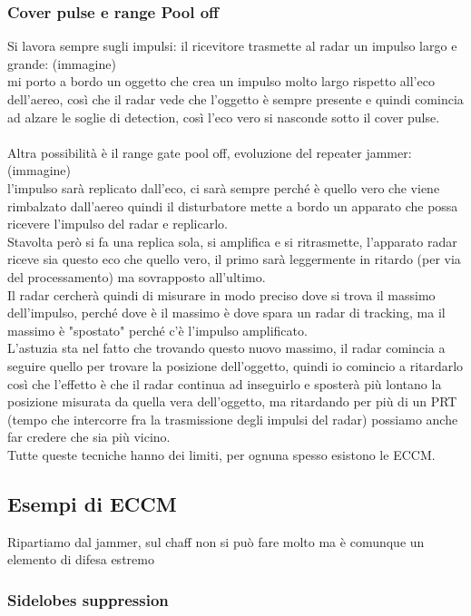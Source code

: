 \documentclass[oneside, 12pt]{extbook}
\begin{document}
\subsubsection{Cover pulse e range Pool off}
Si lavora sempre sugli impulsi: il ricevitore trasmette al radar un impulso largo e grande: (immagine)\\
mi porto a bordo un oggetto che crea un impulso molto largo rispetto all'eco dell'aereo, così che il radar vede che l'oggetto è sempre presente e quindi comincia ad alzare le soglie di detection, così l'eco vero si nasconde sotto il cover pulse.\\\\
Altra possibilità è il range gate pool off, evoluzione del repeater jammer: (immagine)\\
l'impulso sarà replicato dall'eco, ci sarà sempre perché è quello vero che viene rimbalzato dall'aereo quindi il disturbatore mette a bordo un apparato che possa ricevere l'impulso del radar e replicarlo.\\
Stavolta però si fa una replica sola, si amplifica e si ritrasmette, l'apparato radar riceve sia questo eco che quello vero, il primo sarà leggermente in ritardo (per via del processamento) ma sovrapposto all'ultimo.\\
Il radar cercherà quindi di misurare in modo preciso dove si trova il massimo dell'impulso, perché dove è il massimo è dove spara un radar di tracking, ma il massimo è "spostato" perché c'è l'impulso amplificato.\\
L'astuzia sta nel fatto che trovando questo nuovo massimo, il radar comincia a seguire quello per trovare la posizione dell'oggetto, quindi io comincio a ritardarlo così che l'effetto è che il radar continua ad inseguirlo e sposterà più lontano la posizione misurata da quella vera dell'oggetto, ma ritardando per più di un PRT (tempo che intercorre fra la trasmissione degli impulsi del radar) possiamo anche far credere che sia più vicino.\\
Tutte queste tecniche hanno dei limiti, per ognuna spesso esistono le ECCM.

\subsection{Esempi di ECCM}
Ripartiamo dal jammer, sul chaff non si può fare molto ma è comunque un elemento di difesa estremo

\subsubsection{Sidelobes suppression}
\end{document}
